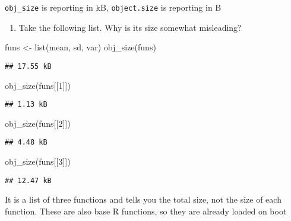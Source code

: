 \documentclass[
]{article}
\newenvironment{Shaded}{\begin{snugshade}}{\end{snugshade}}
\newcommand{\DecValTok}[1]{\textcolor[rgb]{0.00,0.00,0.81}{#1}}
\newcommand{\FunctionTok}[1]{\textcolor[rgb]{0.00,0.00,0.00}{#1}}
\newcommand{\NormalTok}[1]{#1}
\newcommand{\OtherTok}[1]{\textcolor[rgb]{0.56,0.35,0.01}{#1}}
\providecommand{\tightlist}{%
  \setlength{\itemsep}{0pt}\setlength{\parskip}{0pt}}
\begin{document}
\texttt{obj\_size} is reporting in kB, \texttt{object.size} is reporting
in B

\begin{enumerate}
\def\labelenumi{\arabic{enumi}.}
\setcounter{enumi}{1}
\tightlist
\item
  Take the following list. Why is its size somewhat misleading?
\end{enumerate}

\begin{Shaded}
\begin{Highlighting}[]
\NormalTok{funs }\OtherTok{\textless{}{-}} \FunctionTok{list}\NormalTok{(mean, sd, var)}
\FunctionTok{obj\_size}\NormalTok{(funs)}
\end{Highlighting}
\end{Shaded}

\begin{verbatim}
## 17.55 kB
\end{verbatim}

\begin{Shaded}
\begin{Highlighting}[]
\FunctionTok{obj\_size}\NormalTok{(funs[[}\DecValTok{1}\NormalTok{]])}
\end{Highlighting}
\end{Shaded}

\begin{verbatim}
## 1.13 kB
\end{verbatim}

\begin{Shaded}
\begin{Highlighting}[]
\FunctionTok{obj\_size}\NormalTok{(funs[[}\DecValTok{2}\NormalTok{]])}
\end{Highlighting}
\end{Shaded}

\begin{verbatim}
## 4.48 kB
\end{verbatim}

\begin{Shaded}
\begin{Highlighting}[]
\FunctionTok{obj\_size}\NormalTok{(funs[[}\DecValTok{3}\NormalTok{]])}
\end{Highlighting}
\end{Shaded}

\begin{verbatim}
## 12.47 kB
\end{verbatim}

It is a list of three functions and tells you the total size, not the
size of each function. These are also base R functions, so they are
already loaded on boot
\end{document}
